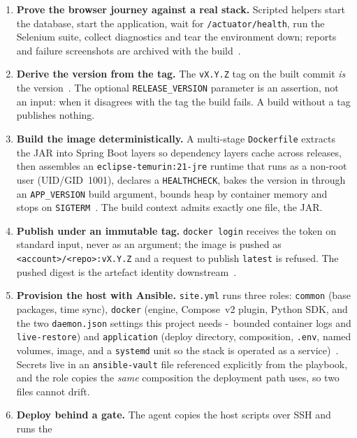 \documentclass[10pt,a4paper]{article}
\begin{document}
\begin{enumerate}[leftmargin=1.9em]
        every later stage consumes; no stage after this one compiles source.
  \item \textbf{Prove the browser journey against a real stack.} Scripted helpers start the
        database, start the application, wait for \texttt{/actuator/health}, run the Selenium
        suite, collect diagnostics and tear the environment down; reports and failure screenshots
        are archived with the build~\cite{selenium}.
  \item \textbf{Derive the version from the tag.} The \texttt{vX.Y.Z} tag on the built commit
        \emph{is} the version~\cite{semver}. The optional \texttt{RELEASE\_VERSION} parameter is an
        assertion, not an input: when it disagrees with the tag the build fails. A build without a
        tag publishes nothing.
  \item \textbf{Build the image deterministically.} A multi-stage \texttt{Dockerfile} extracts the
        JAR into Spring Boot layers so dependency layers cache across releases, then assembles an
        \texttt{eclipse-temurin:21-jre} runtime that runs as a non-root user (UID/GID~1001),
        declares a \texttt{HEALTHCHECK}, bakes the version in through an \texttt{APP\_VERSION}
        build argument, bounds heap by container memory and stops on
        \texttt{SIGTERM}~\cite{dockermulti}. The build context admits exactly one file, the JAR.
  \item \textbf{Publish under an immutable tag.} \texttt{docker login} receives the token on
        standard input, never as an argument; the image is pushed as
        \texttt{<account>/<repo>:vX.Y.Z} and a request to publish \texttt{latest} is refused. The
        pushed digest is the artefact identity downstream~\cite{ociimage}.
  \item \textbf{Provision the host with Ansible.} \texttt{site.yml} runs three roles:
        \texttt{common} (base packages, time sync), \texttt{docker} (engine, Compose~v2 plugin,
        Python SDK, and the two \texttt{daemon.json} settings this project needs -\
        bounded container logs and \texttt{live-restore}) and \texttt{application} (deploy
        directory, composition, \texttt{.env}, named volumes, image, and a \texttt{systemd} unit
        so the stack is operated as a service)~\cite{ansible}. Secrets live in an
        \texttt{ansible-vault} file referenced explicitly from the playbook, and the role copies
        the \emph{same} composition the deployment path uses, so two files cannot drift.
  \item \textbf{Deploy behind a gate.} The agent copies the host scripts over SSH and runs the

\end{enumerate}
\end{document}
